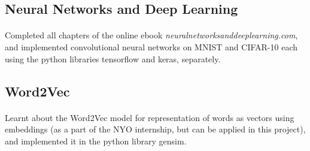 \documentclass{article}
\begin{document}
        \subsection*{\fontsize{16}{20}\selectfont Neural Networks and Deep Learning}
        	\vspace{+1mm}\paragraph{}{\fontsize{13}{16}\selectfont Completed all chapters of the online ebook \textit{neuralnetworksanddeeplearning.com}, and implemented convolutional neural networks on MNIST and CIFAR-10 each using the python libraries tensorflow and keras, separately.}\\[-2mm]
        
        \subsection*{\fontsize{16}{20}\selectfont Word2Vec}
        	\vspace{+1mm}\paragraph{}{\fontsize{13}{16}\selectfont Learnt about the Word2Vec model for representation of words as vectors using embeddings (as a part of the NYO internship, but can be applied in this project), and implemented it in the python library gensim.}
        
    
\end{document}
